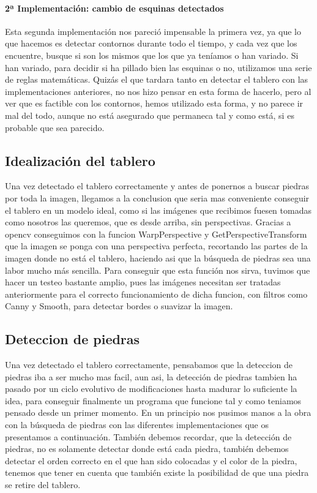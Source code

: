 \documentclass[12pt,a4paper]{report}
\begin{document}
\paragraph{2ª Implementación: cambio de esquinas detectados} 

Esta segunda implementación nos pareció impensable la primera vez, ya que lo que
hacemos es detectar contornos durante todo el tiempo, y cada vez que los
encuentre, busque si son los mismos que los que ya teníamos o han variado. Si
han variado, para decidir si ha pillado bien las esquinas o no, utilizamos una
serie de reglas matemáticas. 
Quizás el que tardara tanto en detectar el tablero con las implementaciones
anteriores, no nos hizo pensar en esta forma de hacerlo, pero al ver que es
factible con los contornos, hemos utilizado esta forma, y no parece ir mal del
todo, aunque no está asegurado que permaneca tal y como está, si es probable que
sea parecido. 

\subsection{Idealización del tablero} 

Una vez detectado el tablero correctamente y antes de ponernos a buscar piedras
por toda la imagen, llegamos a la conclusion que seria mas conveniente conseguir
el tablero en un modelo ideal, como si las imágenes que recibimos fuesen tomadas
como nosotros las queremos, que es desde arriba, sin perspectivas.  Gracias a
opencv conseguimos con la funcion WarpPerspective y GetPerspectiveTransform que 
la imagen se ponga con una
perspectiva perfecta, recortando las partes de la imagen donde no está el
tablero, haciendo asi que la búsqueda de piedras sea una labor mucho más
sencilla. Para conseguir que esta función nos sirva, tuvimos que hacer un
testeo bastante amplio, pues las imágenes necesitan ser tratadas anteriormente
para el correcto funcionamiento de dicha funcion, con filtros como Canny y
Smooth, para detectar bordes o suavizar la imagen. 

\subsection{Deteccion de piedras} 

Una vez detectado el tablero correctamente,
pensabamos que la deteccion de piedras iba a ser mucho mas facil, aun asi, la
detección de piedras tambien ha pasado por un ciclo evolutivo de modificaciones
hasta madurar lo suficiente la idea, para conseguir finalmente un programa que
funcione tal y como teniamos pensado desde un primer momento. En un principio
nos pusimos manos a la obra con la búsqueda de piedras con las diferentes
implementaciones que os presentamos a continuación.
También debemos recordar, que la detección de
piedras, no es solamente detectar donde está cada piedra, también debemos
detectar el orden correcto en el que han sido colocadas y el color de la piedra,
tenemos que tener en cuenta que también existe la posibilidad de que una piedra
se retire del tablero. 
\end{document}
